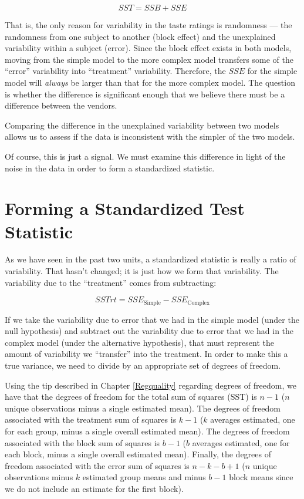 \documentclass[
]{book}
\theoremstyle{plain}
\theoremstyle{mydefn}
\theoremstyle{myexmpl}
\theoremstyle{remark}
\begin{document}
\[SST = SSB + SSE\]

That is, the only reason for variability in the taste ratings is randomness --- the randomness from one subject to another (block effect) and the unexplained variability within a subject (error). Since the block effect exists in both models, moving from the simple model to the more complex model transfers some of the ``error'' variability into ``treatment'' variability. Therefore, the \(SSE\) for the simple model will \emph{always} be larger than that for the more complex model. The question is whether the difference is significant enough that we believe there must be a difference between the vendors.

\begin{rmdkeyidea}
Comparing the difference in the unexplained variability between two models allows us to assess if the data is inconsistent with the simpler of the two models.
\end{rmdkeyidea}

Of course, this is just a signal. We must examine this difference in light of the noise in the data in order to form a standardized statistic.

\hypertarget{forming-a-standardized-test-statistic-1}{%
\section{Forming a Standardized Test Statistic}\label{forming-a-standardized-test-statistic-1}}

As we have seen in the past two units, a standardized statistic is really a ratio of variability. That hasn't changed; it is just how we form that variability. The variability due to the ``treatment'' comes from subtracting:

\[SSTrt = SSE_{\text{Simple}} - SSE_{\text{Complex}}\]

If we take the variability due to error that we had in the simple model (under the null hypothesis) and subtract out the variability due to error that we had in the complex model (under the alternative hypothesis), that must represent the amount of variability we ``transfer'' into the treatment. In order to make this a true variance, we need to divide by an appropriate set of degrees of freedom.

Using the tip described in Chapter \ref{Regquality} regarding degrees of freedom, we have that the degrees of freedom for the total sum of squares (SST) is \(n - 1\) (\(n\) unique observations minus a single estimated mean). The degrees of freedom associated with the treatment sum of squares is \(k - 1\) (\(k\) averages estimated, one for each group, minus a single overall estimated mean). The degrees of freedom associated with the block sum of squares is \(b - 1\) (\(b\) averages estimated, one for each block, minus a single overall estimated mean). Finally, the degrees of freedom associated with the error sum of squares is \(n - k - b + 1\) (\(n\) unique observations minus \(k\) estimated group means and minus \(b - 1\) block means since we do not include an estimate for the first block).
\end{document}
